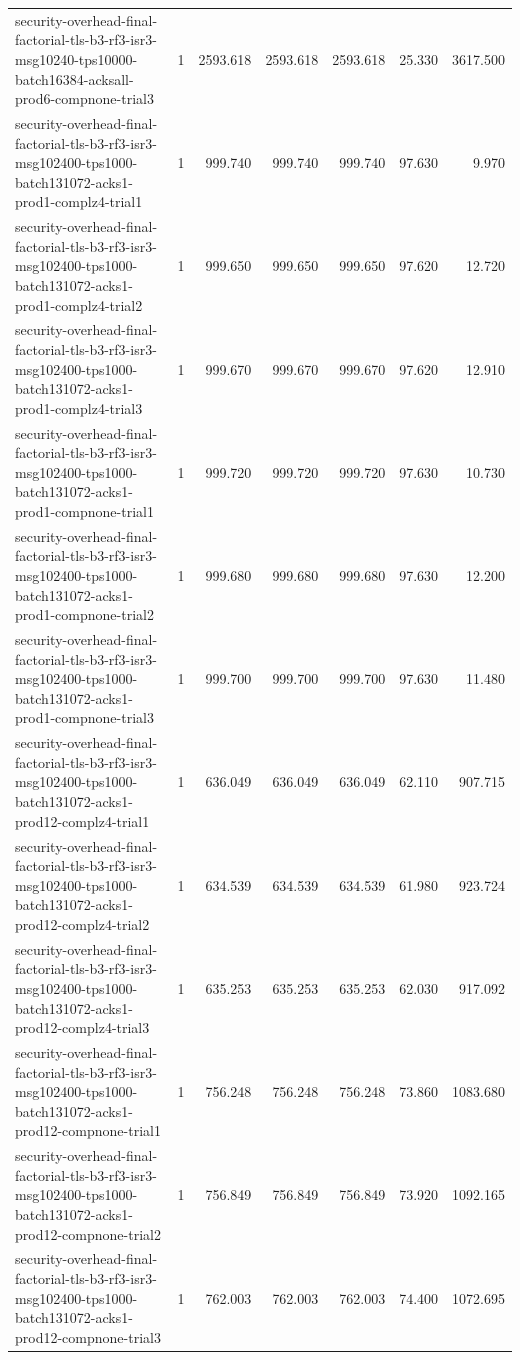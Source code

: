 \begin{tabular}{lrrrrrr}
security-overhead-final-factorial-tls-b3-rf3-isr3-msg10240-tps10000-batch16384-acksall-prod6-compnone-trial3 & 1 & 2593.618 & 2593.618 & 2593.618 & 25.330 & 3617.500 \\
security-overhead-final-factorial-tls-b3-rf3-isr3-msg102400-tps1000-batch131072-acks1-prod1-complz4-trial1 & 1 & 999.740 & 999.740 & 999.740 & 97.630 & 9.970 \\
security-overhead-final-factorial-tls-b3-rf3-isr3-msg102400-tps1000-batch131072-acks1-prod1-complz4-trial2 & 1 & 999.650 & 999.650 & 999.650 & 97.620 & 12.720 \\
security-overhead-final-factorial-tls-b3-rf3-isr3-msg102400-tps1000-batch131072-acks1-prod1-complz4-trial3 & 1 & 999.670 & 999.670 & 999.670 & 97.620 & 12.910 \\
security-overhead-final-factorial-tls-b3-rf3-isr3-msg102400-tps1000-batch131072-acks1-prod1-compnone-trial1 & 1 & 999.720 & 999.720 & 999.720 & 97.630 & 10.730 \\
security-overhead-final-factorial-tls-b3-rf3-isr3-msg102400-tps1000-batch131072-acks1-prod1-compnone-trial2 & 1 & 999.680 & 999.680 & 999.680 & 97.630 & 12.200 \\
security-overhead-final-factorial-tls-b3-rf3-isr3-msg102400-tps1000-batch131072-acks1-prod1-compnone-trial3 & 1 & 999.700 & 999.700 & 999.700 & 97.630 & 11.480 \\
security-overhead-final-factorial-tls-b3-rf3-isr3-msg102400-tps1000-batch131072-acks1-prod12-complz4-trial1 & 1 & 636.049 & 636.049 & 636.049 & 62.110 & 907.715 \\
security-overhead-final-factorial-tls-b3-rf3-isr3-msg102400-tps1000-batch131072-acks1-prod12-complz4-trial2 & 1 & 634.539 & 634.539 & 634.539 & 61.980 & 923.724 \\
security-overhead-final-factorial-tls-b3-rf3-isr3-msg102400-tps1000-batch131072-acks1-prod12-complz4-trial3 & 1 & 635.253 & 635.253 & 635.253 & 62.030 & 917.092 \\
security-overhead-final-factorial-tls-b3-rf3-isr3-msg102400-tps1000-batch131072-acks1-prod12-compnone-trial1 & 1 & 756.248 & 756.248 & 756.248 & 73.860 & 1083.680 \\
security-overhead-final-factorial-tls-b3-rf3-isr3-msg102400-tps1000-batch131072-acks1-prod12-compnone-trial2 & 1 & 756.849 & 756.849 & 756.849 & 73.920 & 1092.165 \\
security-overhead-final-factorial-tls-b3-rf3-isr3-msg102400-tps1000-batch131072-acks1-prod12-compnone-trial3 & 1 & 762.003 & 762.003 & 762.003 & 74.400 & 1072.695 \\

\end{tabular}
